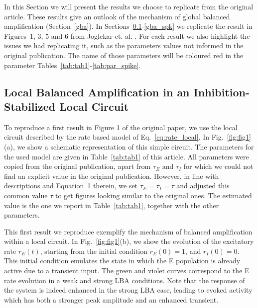 In this Section we will present the results we choose to replicate from the original article. These results give an outlook of the  mechanism of global balanced amplification (Section~\ref{gba}). In Sections~\ref{lba_result}-\ref{gba_spk}
 we replicate the result in Figures~$1$, $3$, $5$ and $6$ from Joglekar et. al. \cite{joglekar2018inter}.  For each result we also highlight the issues we had replicating it, such as the parameters values not informed in the original publication. The name of those parameters  will be coloured red in the parameter Tables~\ref{tab:tab1}-\ref{tab:par_spike}.

\subsection{Local Balanced Amplification in an Inhibition-Stabilized Local Circuit}\label{lba_result}

To reproduce a first result in Figure 1 of the original \cite{joglekar2018inter} paper, we use the local circuit described by the rate based model of Eq.~\ref{eq:rate_local}. In Fig.~\ref{fig:fig1}(a), we show a schematic representation of this simple circuit. The parameters for the used model are given in Table~\ref{tab:tab1} of this article. All parameters were copied from the original publication, apart from $\tau_{E}$ and $\tau_{I}$ for which we could not find an explicit value in the original publication. However, in line with descriptions and Equation~1 therein, we set  $\tau_{E} = \tau_{I}= \tau$ and adjusted this common value $\tau$ to get figures looking similar to the original ones. The estimated value is the one we report in Table~\ref{tab:tab1}, together with the other parameters.

This first result we reproduce exemplify the mechanism of  balanced amplification within a local circuit. In Fig.~\ref{fig:fig1}(b), we show the evolution of the excitatory rate $r_E(t)$, starting from the initial condition $r_E(0) = 1$, and $r_I(0) = 0$. This initial condition emulates the state in which the E population is already active due to a transient input. The green and violet curves correspond to the E rate evolution in a weak and strong LBA conditions. Note that the response of the system is indeed enhanced in the strong LBA case, leading to evoked activity which has both a stronger peak amplitude and an enhanced transient.


